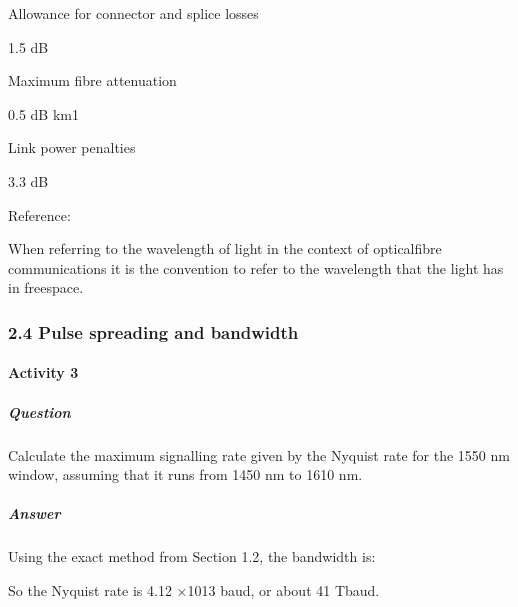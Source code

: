 \documentclass[letterpaper,10pt,english]{sphinxmanual}
\let\sphinxpxdimen\pdfpxdimen\else\newdimen\sphinxpxdimen
\begin{document}
Allowance for connector and splice losses





1.5 dB









Maximum fibre attenuation





0.5 dB km1









Link power penalties





3.3 dB







Reference:



When referring to the wavelength of light in the context of optical\sphinxhyphen{}fibre communications it is the convention to refer to the wavelength that the light has in free\sphinxhyphen{}space.


\subsubsection{2.4 Pulse spreading and bandwidth}
\label{\detokenize{content/session_00/Part_00_02:2.4-Pulse-spreading-and-bandwidth}}

\paragraph{Activity 3}
\label{\detokenize{content/session_00/Part_00_02:Activity-3}}

\subparagraph{Question}
\label{\detokenize{content/session_00/Part_00_02:id9}}
Calculate the maximum signalling rate given by the Nyquist rate for the 1550 nm window, assuming that it runs from 1450 nm to 1610 nm.


\subparagraph{Answer}
\label{\detokenize{content/session_00/Part_00_02:id10}}
Using the exact method from Section 1.2, the bandwidth is:

\sphinxincludegraphics[width=511\sphinxpxdimen,height=87\sphinxpxdimen]{{t305_ue013i}.gif}

So the Nyquist rate is 4.12 ×1013 baud, or about 41 Tbaud.
\end{document}
